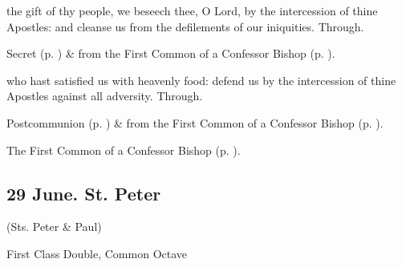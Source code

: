 
\secret
{} the gift of thy people, we beseech thee, O Lord, by the intercession of thine Apostles: and cleanse us from the defilements of our iniquities. Through.


\begin{rubric}
	 Secret  (p. \pageref{JohnBaptistSecret}) \&   from the First Common of a Confessor Bishop (p. \pageref{CommonConfessorBishopISecret}).
\end{rubric}


\postcommunion
{} who hast satisfied us with heavenly food: defend us by the intercession of thine Apostles against all adversity. Through.


\begin{rubric}
	 Postcommunion  (p. \pageref{JohnBaptistPC}) \&   from the First Common of a Confessor Bishop (p. \pageref{CommonConfessorBishopIPostcommunion}).
\end{rubric}



\begin{rubric}
	The First Common of a Confessor Bishop (p. \pageref{CommonConfessorBishopI}).
\end{rubric}


\clearpage

\subsection{29 June. St. Peter}

\centerline{\small{(Sts. Peter \& Paul)}}

\begin{inhead}
	First Class Double, Common Octave
\end{inhead}

